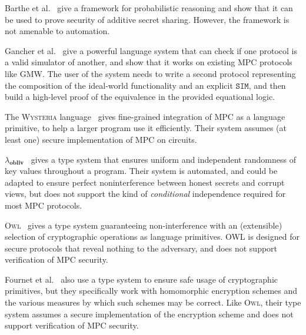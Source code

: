 \documentclass[acmlarge, manuscript, screen, review, anonymous, table]{acmart}
\begin{document}
Barthe et al.~\cite{barthe2019probabilistic} %
give a framework for probabilistic reasoning and show that it can be used to prove security of additive secret sharing.
However, the framework is not amenable to automation.

Gancher et al.~\cite{gancher2023core} %
give a powerful language system that can check if one protocol is a valid simulator of another,
and show that it works on existing MPC protocols like GMW.
The user of the system needs to write a second protocol
representing the composition of the ideal-world functionality and an explicit $\mathtt{SIM}$,
and then build a high-level proof of the equivalence in the provided equational logic.

The \textsc{Wysteria} language~\cite{rastogi2014wysteria} %
gives fine-grained integration of MPC as a language primitive, to help a larger program use it efficiently.
Their system assumes (at least one) secure implementation of MPC on circuits.

$\lambda_\textbf{obliv}$~\cite{darais2019language} %
gives a type system that ensures uniform and independent randomness of key values throughout a program.
Their system is automated, and could be adapted to ensure perfect noninterference between honest secrets and corrupt views,
but does not support the kind of \emph{conditional} independence required for most MPC protocols.

\textsc{Owl}~\cite{gancher2023owl} %
gives a type system guaranteeing non-interference with an (extensible) selection of cryptographic operations as language primitives.
OWL is designed for secure protocols that reveal nothing to the adversary, and does not support verification of MPC security.

Fournet et al.~\cite{fournet2011information} %
also use a type system to ensure safe usage of cryptographic primitives,
but they specifically work with homomorphic encryption schemes and the various measures by which such schemes may be correct.
Like \textsc{Owl}, their type system assumes a secure implementation of the encryption scheme and does not support verification of MPC security.
\end{document}
